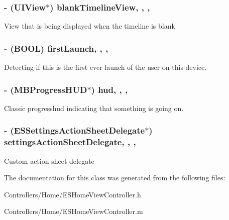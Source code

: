 \subsubsection[{blank\+Timeline\+View}]{\setlength{\rightskip}{0pt plus 5cm}-\/ (U\+I\+View$\ast$) blank\+Timeline\+View\hspace{0.3cm}{\ttfamily [read]}, {\ttfamily [write]}, {\ttfamily [nonatomic]}, {\ttfamily [strong]}}\label{interface_e_s_home_view_controller_af40a45dafb6881f9dd758bbd54f1b1e9}
View that is being displayed when the timeline is blank \hypertarget{interface_e_s_home_view_controller_a9f322cb2123ecf612e39fe938ec66edc}{}
\subsubsection[{first\+Launch}]{\setlength{\rightskip}{0pt plus 5cm}-\/ (B\+O\+O\+L) first\+Launch\hspace{0.3cm}{\ttfamily [read]}, {\ttfamily [write]}, {\ttfamily [nonatomic]}, {\ttfamily [assign]}}\label{interface_e_s_home_view_controller_a9f322cb2123ecf612e39fe938ec66edc}
Detecting if this is the first ever launch of the user on this device. \hypertarget{interface_e_s_home_view_controller_a5eea406162514654d84f14ebfd058792}{}
\subsubsection[{hud}]{\setlength{\rightskip}{0pt plus 5cm}-\/ (M\+B\+Progress\+H\+U\+D$\ast$) hud\hspace{0.3cm}{\ttfamily [read]}, {\ttfamily [write]}, {\ttfamily [nonatomic]}, {\ttfamily [strong]}}\label{interface_e_s_home_view_controller_a5eea406162514654d84f14ebfd058792}
Classic progresshud indicating that something is going on. \hypertarget{interface_e_s_home_view_controller_acc1021c8e2fc133ec780baf31e783bad}{}
\subsubsection[{settings\+Action\+Sheet\+Delegate}]{\setlength{\rightskip}{0pt plus 5cm}-\/ ({\bf E\+S\+Settings\+Action\+Sheet\+Delegate}$\ast$) settings\+Action\+Sheet\+Delegate\hspace{0.3cm}{\ttfamily [read]}, {\ttfamily [write]}, {\ttfamily [nonatomic]}, {\ttfamily [strong]}}\label{interface_e_s_home_view_controller_acc1021c8e2fc133ec780baf31e783bad}
Custom action sheet delegate 

The documentation for this class was generated from the following files\+:\begin{DoxyCompactItemize}
\item 
Controllers/\+Home/E\+S\+Home\+View\+Controller.\+h\item 
Controllers/\+Home/E\+S\+Home\+View\+Controller.\+m\end{DoxyCompactItemize}
